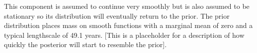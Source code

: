 This component is assumed to continue very smoothly but is also assumed to be stationary so its distribution will eventually return to the prior.
The prior distribution places mass on smooth functions with a marginal mean of zero and a typical lengthscale of 49.1 years.
[This is a placeholder for a description of how quickly the posterior will start to resemble the prior].
